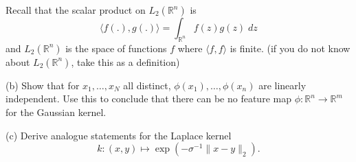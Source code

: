 \documentclass[a4paper,10pt,oneside]{article}
\begin{document}
\begin{enumerate}
Recall that the scalar product on $L_2(\mathbb{R}^n)$ is
$$\langle f(.),g(.)\rangle = \int_{\mathbb{R}^n} f(z) g(z)\; dz$$
and $L_2(\mathbb{R}^n)$ is the space of functions $f$ where $\langle f,f\rangle$ is finite.
(if you do not know about $L_2(\mathbb{R}^n)$, take this as a definition)

(b) Show that for $x_1,\dots, x_N$ all distinct, $\phi (x_1),\dots, \phi(x_n)$ are linearly independent. Use this to conclude that there can be no feature map $\phi: \mathbb{R}^n\longrightarrow \mathbb{R}^m$ for the Gaussian kernel.

(c) Derive analogue statements for the Laplace kernel
$$k :(x,y) \mapsto  \exp \left(-\sigma^{-1}\|x-y\|_2\right).$$
\end{enumerate}
\end{document}
